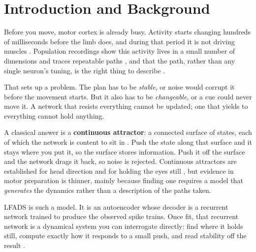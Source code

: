 \documentclass[11pt]{article}
\begin{document}
\begin{abstract}
We also report two lessons about method. Choosing a model by reconstruction
error picks models that explain the data with injected input rather than with
their own dynamics, and those models are useless for studying dynamics. And for
live use, a bounded score should be preferred to an unbounded one even when
offline accuracy is identical.
\end{abstract}

\tableofcontents
\bigskip

\section{Introduction and Background}

Before you move, motor cortex is already busy. Activity starts changing hundreds
of milliseconds before the limb does, and during that period it is not driving
muscles \cite{tanji1976,churchland2012}. Population recordings show this activity
lives in a small number of dimensions and traces repeatable paths
\cite{cunningham2014}, and that the path, rather than any single neuron's tuning,
is the right thing to describe \cite{churchland2012,vyas2020}.

That sets up a problem. The plan has to be \emph{stable}, or noise would corrupt
it before the movement starts. But it also has to be \emph{changeable}, or a cue
could never move it. A network that resists everything cannot be updated; one
that yields to everything cannot hold anything.

A classical answer is a \textbf{continuous attractor}: a connected surface of
states, each of which the network is content to sit in
\cite{seung1996,zhang1996}. Push the state along that surface and it stays where
you put it, so the surface stores information. Push it off the surface and the
network drags it back, so noise is rejected. Continuous attractors are
established for head direction and for holding the eyes still
\cite{zhang1996,chaudhuri2019}, but evidence in motor preparation is thinner,
mainly because finding one requires a model that \emph{generates} the dynamics
rather than a description of the paths taken.

LFADS \cite{pandarinath2018} is such a model. It is an autoencoder whose decoder
is a recurrent network trained to produce the observed spike trains. Once fit,
that recurrent network is a dynamical system you can interrogate directly: find
where it holds still, compute exactly how it responds to a small push, and read
stability off the result \cite{sussillo2013,golub2018}.
\end{document}
